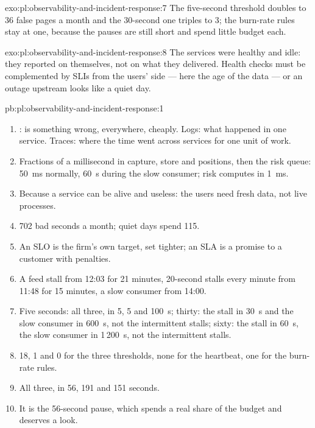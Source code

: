 \begin{solution}{exo:pl:observability-and-incident-response:7}
The five-second threshold doubles to 36 false pages a month and the 30-second one triples to 3; the burn-rate rules stay at one, because the
pauses are still short and spend little budget each.
\end{solution}

\begin{solution}{exo:pl:observability-and-incident-response:8}
The services were healthy and idle: they reported on themselves, not on what they delivered. Health checks must be complemented by SLIs from
the users' side --- here the age of the data --- or an outage upstream looks like a quiet day.
\end{solution}

\begin{solution}{pb:pl:observability-and-incident-response:1}
\begin{enumerate}
\item {}: is something wrong, everywhere, cheaply. Logs: what happened in one service. Traces: where the time went across services for one
unit of work.
\item Fractions of a millisecond in capture, store and positions, then the risk queue: 50~ms normally, 60~s during the slow consumer; risk
computes in 1~ms.
\item Because a service can be alive and useless: the users need fresh data, not live processes.
\item 702 bad seconds a month; quiet days spend 115.
\item An SLO is the firm's own target, set tighter; an SLA is a promise to a customer with penalties.
\item A feed stall from 12:03 for 21 minutes, 20-second stalls every minute from 11:48 for 15 minutes, a slow consumer from 14:00.
\item Five seconds: all three, in 5, 5 and 100~s; thirty: the stall in 30~s and the slow consumer in 600~s, not the intermittent stalls;
sixty: the stall in 60~s, the slow consumer in 1\,200~s, not the intermittent stalls.
\item 18, 1 and 0 for the three thresholds, none for the heartbeat, one for the burn-rate rules.
\item All three, in 56, 191 and 151 seconds.
\item It is the 56-second pause, which spends a real share of the budget and deserves a look.

\end{enumerate}
\end{solution}
